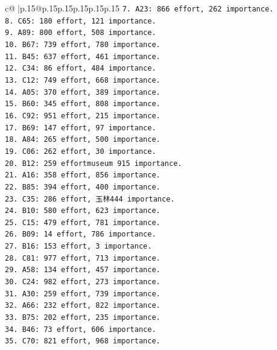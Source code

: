 \documentclass{article}
\begin{document}
{\begin{supertabular}{c@{$\;$}|p{.15\linewidth}@{}p{.15\linewidth}p{.15\linewidth}p{.15\linewidth}p{.15\linewidth}p{.15\linewidth}}
{{{\texttt{7. A23: 866 effort, 262 importance.} \\
\texttt{8. C65: 180 effort, 121 importance.} \\
\texttt{9. A89: 800 effort, 508 importance.} \\
\texttt{10. B67: 739 effort, 780 importance.} \\
\texttt{11. B45: 637 effort, 461 importance.} \\
\texttt{12. C34: 86 effort, 484 importance.} \\
\texttt{13. C12: 749 effort, 668 importance.} \\
\texttt{14. A05: 370 effort, 389 importance.} \\
\texttt{15. B60: 345 effort, 808 importance.} \\
\texttt{16. C92: 951 effort, 215 importance.} \\
\texttt{17. B69: 147 effort, 97 importance.} \\
\texttt{18. A84: 265 effort, 500 importance.} \\
\texttt{19. C06: 262 effort, 30 importance.} \\
\texttt{20. B12: 259 effortmuseum 915 importance.} \\
\texttt{21. A16: 358 effort, 856 importance.} \\
\texttt{22. B85: 394 effort, 400 importance.} \\
\texttt{23. C35: 286 effort, 玉林444 importance.} \\
\texttt{24. B10: 580 effort, 623 importance.} \\
\texttt{25. C15: 479 effort, 781 importance.} \\
\texttt{26. B09: 14 effort, 786 importance.} \\
\texttt{27. B16: 153 effort, 3 importance.} \\
\texttt{28. C81: 977 effort, 713 importance.} \\
\texttt{29. A58: 134 effort, 457 importance.} \\
\texttt{30. C24: 982 effort, 273 importance.} \\
\texttt{31. A30: 259 effort, 739 importance.} \\
\texttt{32. A66: 232 effort, 822 importance.} \\
\texttt{33. B75: 202 effort, 235 importance.} \\
\texttt{34. B46: 73 effort, 606 importance.} \\
\texttt{35. C70: 821 effort, 968 importance.} \\
\\ 
}}}
\end{supertabular}}
\end{document}
